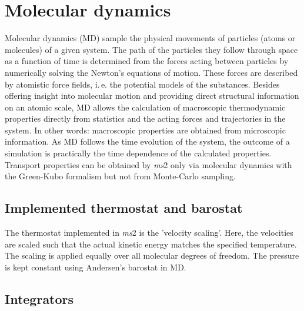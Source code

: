 	\label{tab:ReductionScheme}
\renewcommand{\arraystretch}{1}	
	
	
	

\section{Molecular dynamics}
\label{sec:Molecular Dynamics}

Molecular dynamics (MD) sample the physical movements of particles (atoms or molecules) of a given system. The path of the particles they follow through space as a function of time is determined from the forces acting between particles by numerically solving the Newton's equations of motion. These forces are described by atomistic force fields, i.\,e. the potential models of the substances. Besides offering insight into molecular motion and providing direct structural information on an atomic scale, MD allows the calculation of macroscopic thermodynamic properties directly from statistics and the acting forces and trajectories in the system. In other words: macroscopic properties are obtained from microscopic information. As MD follows the time evolution of the system, the outcome of a simulation is practically the time dependence of the calculated properties.\\
Transport properties can be obtained by \textit{ms}2 only via molecular dynamics with the Green-Kubo formalism but not from Monte-Carlo sampling.



\subsection{Implemented thermostat and barostat}
\label{sec:Implemented Thermostat and Barostat}

The thermostat implemented in \textit{ms}2 is the 'velocity scaling'. Here, the velocities are scaled such that the actual kinetic energy matches the specified temperature. The scaling is applied equally over all molecular degrees of freedom. The pressure is kept constant using Andersen's barostat in MD.



\subsection{Integrators}
\label{sec:Integrators}


